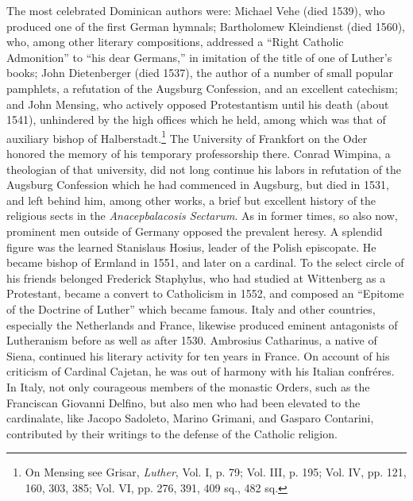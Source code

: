 The most celebrated Dominican authors were: Michael Vehe (died
1539), who produced one of the first German hymnals; Bartholomew
Kleindienst (died 1560), who, among other literary compositions,
addressed a “Right Catholic Admonition” to “his dear Germans,” in
imitation of the title of one of Luther’s books; John Dietenberger
(died 1537), the author of a number of small popular pamphlets, a
refutation of the Augsburg Confession, and an excellent catechism;
and John Mensing, who actively opposed Protestantism until his
death (about 1541), unhindered by the high offices which he held,
among which was that of auxiliary bishop of Halberstadt.\footnote
{On Mensing see Grisar, \textit{Luther}, Vol. I, p. 79; Vol. III, p. 195; Vol. IV, pp. 121, 160,
303, 385; Vol. VI, pp. 276, 391, 409 sq., 482 sq.}
The University
of Frankfort on the Oder honored the memory of his temporary professorship
there. Conrad Wimpina, a theologian of that university, did not long continue
his labors in refutation of the Augsburg
Confession which he had commenced in Augsburg, but died in 1531,
and left behind him, among other works, a brief but excellent history
of the religious sects in the \textit{Anacepbalacosis Sectarum}.
As in former times, so also now, prominent men outside of Germany
opposed the prevalent heresy. A splendid figure was the learned
Stanislaus Hosius, leader of the Polish episcopate. He became bishop
of Ermland in 1551, and later on a cardinal. To the select circle of
his friends belonged Frederick Staphylus, who had studied at Wittenberg
as a Protestant, became a convert to Catholicism in 1552, and
composed an “Epitome of the Doctrine of Luther” which became
famous. Italy and other countries, especially the Netherlands and
France, likewise produced eminent antagonists of Lutheranism before
as well as after 1530. Ambrosius Catharinus, a native of Siena, continued
his literary activity for ten years in France. On account of his
criticism of Cardinal Cajetan, he was out of harmony with his Italian
confréres. In Italy, not only courageous members of the monastic
Orders, such as the Franciscan Giovanni Delfino, but also men who
had been elevated to the cardinalate, like Jacopo Sadoleto, Marino
Grimani, and Gasparo Contarini, contributed by their writings to the
defense of the Catholic religion.
